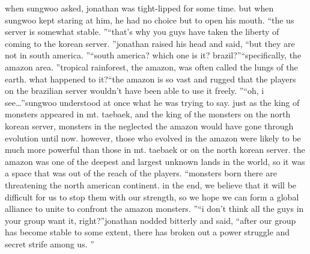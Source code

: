 when sungwoo asked, jonathan was tight-lipped for some time.
but when sungwoo kept staring at him, he had no choice but to open his mouth.
“the us server is somewhat stable.
”“that’s why you guys have taken the liberty of coming to the korean server.
”jonathan raised his head and said, “but they are not in south america.
”“south america? which one is it? brazil?”“specifically, the amazon area.
”tropical rainforest, the amazon, was often called the lungs of the earth.
 what happened to it?“the amazon is so vast and rugged that the players on the brazilian server wouldn’t have been able to use it freely.
”“oh, i see…”sungwoo understood at once what he was trying to say.
 just as the king of monsters appeared in mt.
 taebaek, and the king of the monsters on the north korean server, monsters in the neglected the amazon would have gone through evolution until now.
however, those who evolved in the amazon were likely to be much more powerful than those in mt.
 taebaek or on the north korean server.
the amazon was one of the deepest and largest unknown lands in the world, so it was a space that was out of the reach of the players.
“monsters born there are threatening the north american continent.
 in the end, we believe that it will be difficult for us to stop them with our strength, so we hope we can form a global alliance to unite to confront the amazon monsters.
”“i don’t think all the guys in your group want it, right?”jonathan nodded bitterly and said, “after our group has become stable to some extent, there has broken out a power struggle and secret strife among us.
”

 